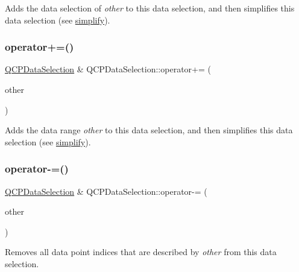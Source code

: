 Adds the data selection of {\itshape other} to this data selection, and then simplifies this data selection (see \mbox{\hyperlink{class_q_c_p_data_selection_a4a2fbad1a6e4d1dd26fdfdf88956f2a4}{simplify}}). \mbox{\label{class_q_c_p_data_selection_a17058640d4e6f49984a0e7e42043df1b}} 
\subsubsection{\texorpdfstring{operator+=()}{operator+=()}\hspace{0.1cm}{\footnotesize\ttfamily [2/2]}}
{\footnotesize\ttfamily \mbox{\hyperlink{class_q_c_p_data_selection}{Q\+C\+P\+Data\+Selection}} \& Q\+C\+P\+Data\+Selection\+::operator+= (\begin{DoxyParamCaption}\item[{const \mbox{\hyperlink{class_q_c_p_data_range}{Q\+C\+P\+Data\+Range}} \&}]{other }\end{DoxyParamCaption})}

Adds the data range {\itshape other} to this data selection, and then simplifies this data selection (see \mbox{\hyperlink{class_q_c_p_data_selection_a4a2fbad1a6e4d1dd26fdfdf88956f2a4}{simplify}}). \mbox{\label{class_q_c_p_data_selection_a66f9fab70b026baa64bf8e52fe5de07e}} 
\subsubsection{\texorpdfstring{operator-\/=()}{operator-=()}\hspace{0.1cm}{\footnotesize\ttfamily [1/2]}}
{\footnotesize\ttfamily \mbox{\hyperlink{class_q_c_p_data_selection}{Q\+C\+P\+Data\+Selection}} \& Q\+C\+P\+Data\+Selection\+::operator-\/= (\begin{DoxyParamCaption}\item[{const \mbox{\hyperlink{class_q_c_p_data_selection}{Q\+C\+P\+Data\+Selection}} \&}]{other }\end{DoxyParamCaption})}

Removes all data point indices that are described by {\itshape other} from this data selection. \mbox{\label{class_q_c_p_data_selection_a8d18b20d20dde737eefc10967e31cf73}} 
